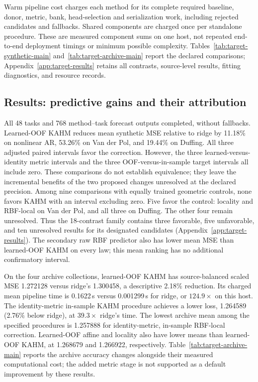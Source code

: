 Warm pipeline cost charges each method for its complete required
baseline, donor, metric, bank, head-selection and serialization work,
including rejected candidates and fallbacks. Shared components are
charged once per standalone procedure. These are measured component
sums on one host, not repeated end-to-end deployment timings or minimum
possible complexity. Tables~\ref{tab:target-synthetic-main}
and~\ref{tab:target-archive-main} report the declared comparisons;
Appendix~\ref{app:target-results} retains all contrasts, source-level
results, fitting diagnostics, and resource records.

\subsection{Results: predictive gains and their attribution}
\label{sec:target-results}

All 48 tasks and 768 method--task forecast outputs completed, without
fallbacks. Learned-OOF KAHM reduces mean synthetic MSE relative to ridge
by 11.18\% on nonlinear AR, 53.26\% on Van der Pol, and 19.44\% on
Duffing. All three adjusted paired intervals favor the correction.
However, the three learned-versus-identity metric intervals and the
three OOF-versus-in-sample target intervals all include zero. These
comparisons do not establish equivalence; they leave the incremental
benefits of the two proposed changes unresolved at the declared
precision. Among nine comparisons with equally trained geometric
controls, none favors KAHM with an interval excluding zero. Five favor
the control: locality and RBF-local on Van der Pol, and all three on
Duffing. The other four remain unresolved. Thus the 18-contrast family
contains three favorable, five unfavorable, and ten unresolved results
for its designated candidates
(Appendix~\ref{app:target-results}). The secondary raw RBF predictor
also has lower mean MSE than learned-OOF KAHM on every law; this mean
ranking has no additional confirmatory interval.

On the four archive collections, learned-OOF KAHM has
source-balanced scaled MSE 1.272128 versus ridge's 1.300458, a
descriptive 2.18\% reduction. Its charged mean pipeline time is
0.1622\,s versus 0.001299\,s for ridge, or $124.9\times$ on this host.
The identity-metric in-sample KAHM procedure achieves a lower loss,
1.264589 (2.76\% below ridge), at $39.3\times$ ridge's time. The
lowest archive mean among the specified procedures is 1.257888 for identity-metric,
in-sample RBF-local correction. Learned-OOF affine and locality also
have lower means than learned-OOF KAHM, at 1.268679 and 1.266922,
respectively. Table~\ref{tab:target-archive-main} reports the archive accuracy
changes alongside their measured computational cost;
the added metric stage is not supported as a default improvement by
these results.

